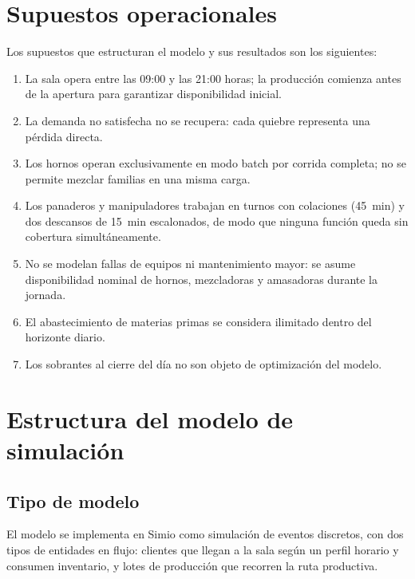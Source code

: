 \documentclass[12pt]{article}
\begin{document}
\newpage
\section{Supuestos operacionales}

Los supuestos que estructuran el modelo y sus resultados son los siguientes:

\begin{enumerate}
  \item La sala opera entre las 09:00 y las 21:00 horas; la producción comienza antes de la apertura para garantizar disponibilidad inicial.
  \item La demanda no satisfecha no se recupera: cada quiebre representa una pérdida directa.
  \item Los hornos operan exclusivamente en modo batch por corrida completa; no se permite mezclar familias en una misma carga.
  \item Los panaderos y manipuladores trabajan en turnos con colaciones (45~min) y dos descansos de 15~min escalonados, de modo que ninguna función queda sin cobertura simultáneamente.
  \item No se modelan fallas de equipos ni mantenimiento mayor: se asume disponibilidad nominal de hornos, mezcladoras y amasadoras durante la jornada.
  \item El abastecimiento de materias primas se considera ilimitado dentro del horizonte diario.
  \item Los sobrantes al cierre del día no son objeto de optimización del modelo.
\end{enumerate}

\newpage
\section{Estructura del modelo de simulación}

\subsection{Tipo de modelo}

El modelo se implementa en Simio como simulación de eventos discretos, con dos tipos de entidades en flujo: clientes que llegan a la sala según un perfil horario y consumen inventario, y lotes de producción que recorren la ruta productiva.
\end{document}
